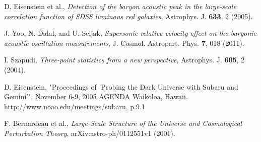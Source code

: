 \documentclass[12pt]{article}
\begin{document}
\begin{thebibliography}{1}

D. Eisenstein et al., \emph{Detection of the baryon acoustic peak in the large-scale correlation function of SDSS luminous red galaxies}, Astrophys. J. \textbf{633}, 2 (2005).

J. Yoo, N. Dalal, and U. Seljak, \emph{Supersonic relative velocity effect on the baryonic acoustic oscillation measurements}, J. Cosmol. Astropart. Phys. \textbf{7}, 018 (2011). 

I. Szapudi, \emph{Three-point statistics from a new perspective}, Astrophys. J. \textbf{605}, 2 (2004).

D. Eisenstein, "Proceedings of 'Probing the Dark Universe with Subaru and Gemini'". November 6-9, 2005 AGENDA Waikoloa, Hawaii. http://www.noao.edu/meetings/subaru, p.9.1

F. Bernardeau et al., \emph{Large-Scale Structure of the Universe and Cosmological Perturbation Theory}, arXiv:astro-ph/0112551v1 (2001).

\end{thebibliography}
\end{document}
